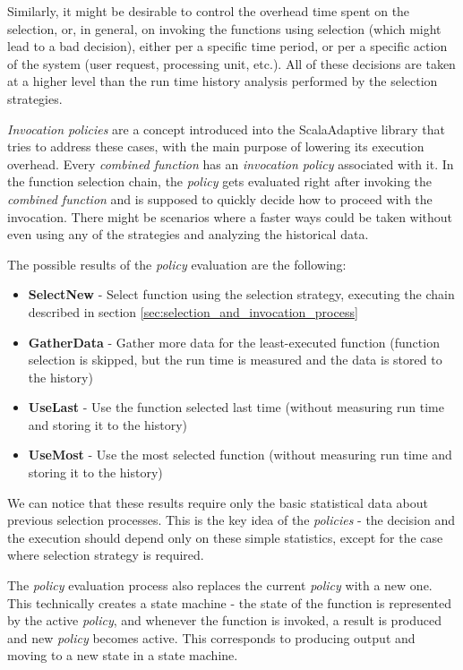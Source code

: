 Similarly, it might be desirable to control the overhead time spent on the selection, or, in general, on invoking the functions using selection (which might lead to a bad decision), either per a specific time period, or per a specific action of the system (user request, processing unit, etc.). All of these decisions are taken at a higher level than the run time history analysis performed by the selection strategies.  

\textit{Invocation policies} are a concept introduced into the ScalaAdaptive library that tries to address these cases, with the main purpose of lowering its execution overhead. Every \textit{combined function} has an \textit{invocation policy} associated with it. In the function selection chain, the \textit{policy} gets evaluated right after invoking the \textit{combined function} and is supposed to quickly decide how to proceed with the invocation. There might be scenarios where a faster ways could be taken without even using any of the strategies and analyzing the historical data.

The possible results of the \textit{policy} evaluation are the following:

\begin{itemize}
	\item \textbf{SelectNew} - Select function using the selection strategy, executing the chain described in section \ref{sec:selection_and_invocation_process}
	\item \textbf{GatherData} - Gather more data for the least-executed function (function selection is skipped, but the run time is measured and the data is stored to the history)
	\item \textbf{UseLast} - Use the function selected last time (without measuring run time and storing it to the history)
	\item \textbf{UseMost} - Use the most selected function (without measuring run time and storing it to the history)
\end{itemize}

We can notice that these results require only the basic statistical data about previous selection processes. This is the key idea of the \textit{policies} - the decision and the execution should depend only on these simple statistics, except for the case where selection strategy is required.

The \textit{policy} evaluation process also replaces the current \textit{policy} with a new one. This technically creates a state machine - the state of the function is represented by the active \textit{policy}, and whenever the function is invoked, a result is produced and new \textit{policy} becomes active. This corresponds to producing output and moving to a new state in a state machine.

